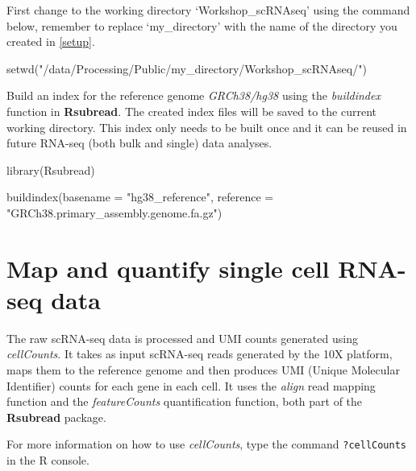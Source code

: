 \documentclass[
]{book}
\newenvironment{Shaded}{\begin{snugshade}}{\end{snugshade}}
\newcommand{\AttributeTok}[1]{\textcolor[rgb]{0.77,0.63,0.00}{#1}}
\newcommand{\FunctionTok}[1]{\textcolor[rgb]{0.00,0.00,0.00}{#1}}
\newcommand{\NormalTok}[1]{#1}
\newcommand{\StringTok}[1]{\textcolor[rgb]{0.31,0.60,0.02}{#1}}
\begin{document}
First change to the working directory `Workshop\_scRNAseq' using the command below, remember to replace `my\_directory' with the name of the directory you created in \ref{setup}.

\begin{Shaded}
\begin{Highlighting}[]
\FunctionTok{setwd}\NormalTok{(}\StringTok{"/data/Processing/Public/my\_directory/Workshop\_scRNAseq/"}\NormalTok{)}
\end{Highlighting}
\end{Shaded}

Build an index for the reference genome \emph{GRCh38/hg38} using the \emph{buildindex} function in \textbf{Rsubread}. The created index files will be saved to the current working directory. This index only needs to be built once and it can be reused in future RNA-seq (both bulk and single) data analyses.

\begin{Shaded}
\begin{Highlighting}[]
\FunctionTok{library}\NormalTok{(Rsubread)}
\end{Highlighting}
\end{Shaded}

\begin{Shaded}
\begin{Highlighting}[]
\FunctionTok{buildindex}\NormalTok{(}\AttributeTok{basename =} \StringTok{"hg38\_reference"}\NormalTok{, }
           \AttributeTok{reference =} \StringTok{"GRCh38.primary\_assembly.genome.fa.gz"}\NormalTok{)}
\end{Highlighting}
\end{Shaded}

\hypertarget{counts}{%
\section{Map and quantify single cell RNA-seq data}\label{counts}}

The raw scRNA-seq data is processed and UMI counts generated using \emph{cellCounts}. It takes as input scRNA-seq reads generated by the 10X platform, maps them to the reference genome and then produces UMI (Unique Molecular Identifier) counts for each gene in each cell. It uses the \emph{align} read mapping function and the \emph{featureCounts} quantification function, both part of the \textbf{Rsubread} package.

For more information on how to use \emph{cellCounts}, type the command \texttt{?cellCounts} in the R console.
\end{document}
